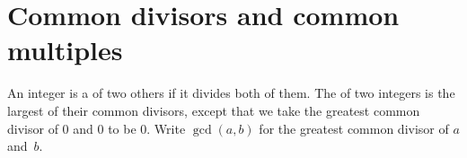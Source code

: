 \documentclass{test}  %
\begin{document}
\begin{problem}
\end{problem}







\section{Common divisors and common multiples}

\begin{df}
An integer is a  of two others if it
divides both of them.
The  of two integers 
is the largest of their common divisors,
except that we take the greatest common divisor of $0$ and $0$ 
to be $0$.
Write $\gcd(a,b)$ for the greatest common divisor
of $a$ and~$b$.
\end{df}
\end{document}
